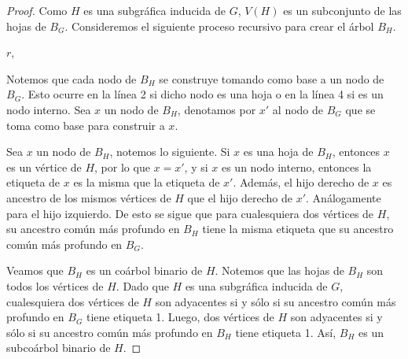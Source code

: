 \begin{proof}
Como $H$ es una subgráfica inducida de $G$, $V(H)$ es un subconjunto de las hojas de $B_G$. Consideremos el siguiente proceso recursivo para crear el árbol $B_H$.

\begin{algorithm}[H]
\DontPrintSemicolon
{}
    \Return $r$,
\end{algorithm}

Notemos que cada nodo de $B_H$ se construye tomando como base a un nodo de $B_G$. Esto ocurre en la línea 2 si dicho nodo es una hoja o en la línea 4 si es un nodo interno. Sea $x$ un nodo de $B_H$, denotamos por $x'$ al nodo de $B_G$ que se toma como base para construir a $x$.

Sea $x$ un nodo de $B_H$, notemos lo siguiente. Si $x$ es una hoja de $B_H$, entonces $x$ es un vértice de $H$, por lo que $x = x'$, y si $x$ es un nodo interno, entonces la etiqueta de $x$ es la misma que la etiqueta de $x'$. Además, el hijo derecho de $x$ es ancestro de los mismos vértices de $H$ que el hijo derecho de $x'$. Análogamente para el hijo izquierdo. De esto se sigue que para cualesquiera dos vértices de $H$, su ancestro común más profundo en $B_H$ tiene la misma etiqueta que su ancestro común más profundo en $B_G$.

Veamos que $B_H$ es un coárbol binario de $H$. Notemos que las hojas de $B_H$ son todos los vértices de $H$. Dado que $H$ es una subgráfica inducida de $G$, cualesquiera dos vértices de $H$ son adyacentes si y sólo si su ancestro común más profundo en $B_G$ tiene etiqueta 1. Luego, dos vértices de $H$ son adyacentes si y sólo si su ancestro común más profundo en $B_H$ tiene etiqueta 1. Así, $B_H$ es un subcoárbol binario de $H$.


\end{proof}
